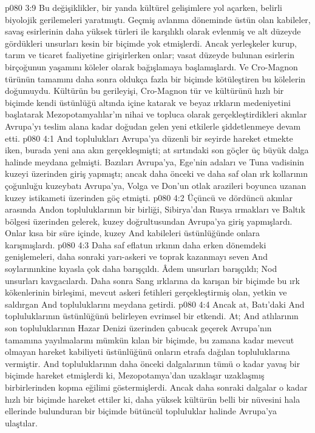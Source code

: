 \vs p080 3:9 Bu değişiklikler, bir yanda kültürel gelişimlere yol açarken, belirli biyolojik gerilemeleri yaratmıştı. Geçmiş avlanma döneminde üstün olan kabileler, savaş esirlerinin daha yüksek türleri ile karşılıklı olarak evlenmiş ve alt düzeyde gördükleri unsurları kesin bir biçimde yok etmişlerdi. Ancak yerleşkeler kurup, tarım ve ticaret faaliyetine girişirlerken onlar; vasat düzeyde bulunan esirlerin birçoğunun yaşamını köleler olarak bağışlamaya başlamışlardı. Ve Cro\hyp{}Magnon türünün tamamını daha sonra oldukça fazla bir biçimde kötüleştiren bu kölelerin doğumuydu. Kültürün bu gerileyişi, Cro\hyp{}Magnon tür ve kültürünü hızlı bir biçimde kendi üstünlüğü altında içine katarak ve beyaz ırkların medeniyetini başlatarak Mezopotamyalılar’ın nihai ve topluca olarak gerçekleştirdikleri akınlar Avrupa’yı teslim alana kadar doğudan gelen yeni etkilerle şiddetlenmeye devam etti.
\vs p080 4:1 And toplulukları Avrupa’ya düzenli bir seyirde hareket etmekte iken, burada yeni ana akın gerçekleşmişti; at sırtındaki son göçler üç büyük dalga halinde meydana gelmişti. Bazıları Avrupa’ya, Ege’nin adaları ve Tuna vadisinin kuzeyi üzerinden giriş yapmıştı; ancak daha önceki ve daha saf olan ırk kollarının çoğunluğu kuzeybatı Avrupa’ya, Volga ve Don’un otlak arazileri boyunca uzanan kuzey istikameti üzerinden göç etmişti.
\vs p080 4:2 Üçüncü ve dördüncü akınlar arasında Andon topluluklarının bir birliği, Sibirya’dan Rusya ırmakları ve Baltık bölgesi üzerinden gelerek, kuzey doğrultusundan Avrupa’ya giriş yapmışlardı. Onlar kısa bir süre içinde, kuzey And kabileleri üstünlüğünde onlara karışmışlardı.
\vs p080 4:3 Daha saf eflatun ırkının daha erken dönemdeki genişlemeleri, daha sonraki yarı\hyp{}askeri ve toprak kazanmayı seven And soylarınınkine kıyasla çok daha barışçıldı. Âdem unsurları barışçıldı; Nod unsurları kavgacılardı. Daha sonra Sang ırklarına da karışan bir biçimde bu ırk kökenlerinin birleşimi, mevcut askeri fetihleri gerçekleştirmiş olan, yetkin ve saldırgan And topluluklarını meydana getirdi.
\vs p080 4:4 Ancak at, Batı’daki And topluluklarının üstünlüğünü belirleyen evrimsel bir etkendi. At; And atlılarının son topluluklarının Hazar Denizi üzerinden çabucak geçerek Avrupa’nın tamamına yayılmalarını mümkün kılan bir biçimde, bu zamana kadar mevcut olmayan hareket kabiliyeti üstünlüğünü onların etrafa dağılan topluluklarına vermiştir. And topluluklarının daha önceki dalgalarının tümü o kadar yavaş bir biçimde hareket etmişlerdi ki, Mezopotamya’dan uzaklaşır uzaklaşmış birbirlerinden kopma eğilimi göstermişlerdi. Ancak daha sonraki dalgalar o kadar hızlı bir biçimde hareket ettiler ki, daha yüksek kültürün belli bir nüvesini hala ellerinde bulunduran bir biçimde bütüncül topluluklar halinde Avrupa’ya ulaştılar.
